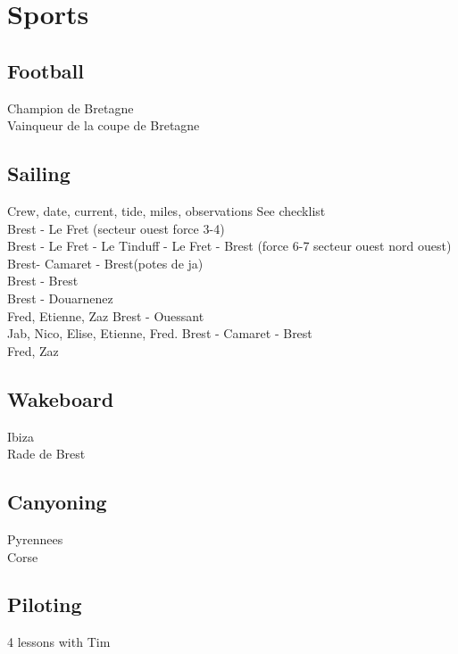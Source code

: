 \documentclass[8pt]{article} %
\begin{document}
\section{Sports}

\subsection{Football}
Champion de Bretagne\\
Vainqueur de la coupe de Bretagne

\subsection{Sailing}

Crew, date, current, tide, miles, observations
See checklist\\

Brest - Le Fret (secteur ouest force 3-4)\\

Brest - Le Fret - Le Tinduff - Le Fret - Brest (force 6-7 secteur ouest nord ouest) \\
Brest- Camaret - Brest(potes de ja)\\
Brest - Brest\\

Brest - Douarnenez\\
Fred, Etienne, Zaz
Brest - Ouessant\\
Jab, Nico, Elise, Etienne, Fred. 
Brest - Camaret - Brest\\
Fred, Zaz

\subsection{Wakeboard}
Ibiza\\
Rade de Brest\\

\subsection{Canyoning}
Pyrennees\\ 
Corse\\

\subsection{Piloting}
4 lessons with Tim\\
\end{document}
